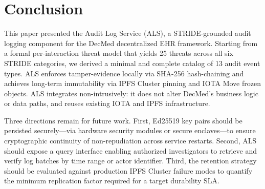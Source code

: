 \section{Conclusion}
\label{sec:conclusion}

This paper presented the Audit Log Service (ALS), a STRIDE-grounded audit
logging component for the DecMed decentralized EHR framework. Starting from
a formal per-interaction threat model that yields 25 threats across all six
STRIDE categories, we derived a minimal and complete catalog of 13 audit
event types. ALS enforces tamper-evidence locally via SHA-256 hash-chaining
and achieves long-term immutability via IPFS Cluster pinning and IOTA Move
frozen objects. ALS integrates non-intrusively: it does not alter DecMed's
business logic or data paths, and reuses existing IOTA and IPFS
infrastructure.

Three directions remain for future work. First, Ed25519 key pairs should be
persisted securely---via hardware security modules or secure enclaves---to
ensure cryptographic continuity of non-repudiation across service restarts.
Second, ALS should expose a query interface enabling authorized investigators
to retrieve and verify log batches by time range or actor identifier. Third,
the retention strategy should be evaluated against production IPFS Cluster
failure modes to quantify the minimum replication factor required for a
target durability SLA.